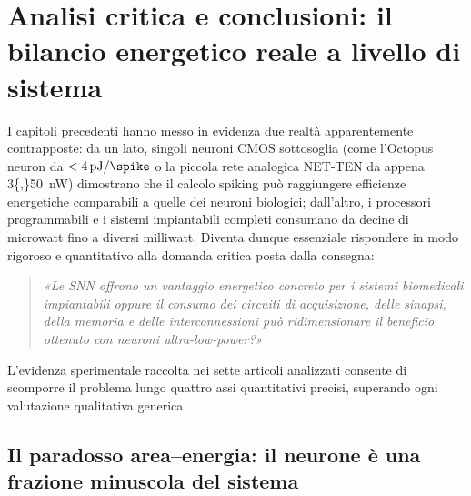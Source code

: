 \section[Analisi critica e conclusioni]{Analisi critica e conclusioni: il bilancio energetico reale a livello di sistema}
\label{sec:conclusioni}

I capitoli precedenti hanno messo in evidenza due realtà apparentemente contrapposte: da un lato, singoli neuroni CMOS sottosoglia (come l'Octopus neuron da $<\SI{4}{\pico\joule\per\spike}$ o la piccola rete analogica NET-TEN da appena \SI{3{,}50}{\nano\watt}) dimostrano che il calcolo spiking può raggiungere efficienze energetiche comparabili a quelle dei neuroni biologici; dall'altro, i processori programmabili e i sistemi impiantabili completi consumano da decine di microwatt fino a diversi milliwatt. Diventa dunque essenziale rispondere in modo rigoroso e quantitativo alla domanda critica posta dalla consegna:

\begin{quote}
  \itshape
  «Le SNN offrono un vantaggio energetico concreto per i sistemi biomedicali impiantabili oppure il consumo dei circuiti di acquisizione, delle sinapsi, della memoria e delle interconnessioni può ridimensionare il beneficio ottenuto con neuroni ultra-low-power?»
\end{quote}

L'evidenza sperimentale raccolta nei sette articoli analizzati consente di scomporre il problema lungo quattro assi quantitativi precisi, superando ogni valutazione qualitativa generica.

\subsection{Il paradosso area--energia: il neurone è una frazione minuscola del sistema}
\label{subsec:paradosso_sistema}

